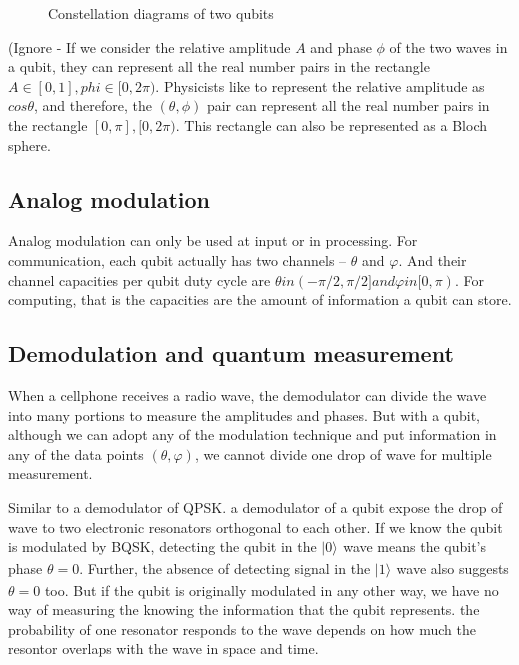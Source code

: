 \documentclass{book}
\newcommand{\keta}[2][]{\vert {#2} \rangle_{#1}}
\begin{document}
\begin{figure}[ht]
\caption{Constellation diagrams of two qubits}
\label{QAM}
\end{figure}

(Ignore - If we consider the relative amplitude $A$ and phase $\phi$ of the two waves in a qubit, they can represent all the real number pairs in the rectangle ${ A \in [0,1], phi \in [0,2\pi) }$. Physicists like to represent the relative amplitude as $cos\theta$, and therefore, the $(\theta, \phi)$ pair can represent all the real number pairs in the rectangle ${[0,\pi],  [0,2\pi)}$. This rectangle can also be represented as a Bloch sphere.

\subsection{Analog modulation}
Analog modulation can only be used at input or in processing. For communication, each qubit actually has two channels -- $\theta$ and $\varphi$. And their channel capacities per qubit duty cycle are $\theta in (-\pi/2, \pi/2] and \varphi in [0, \pi)$. For computing, that is the capacities are the amount of information a qubit can store.

\subsection{Demodulation and quantum measurement}
When a cellphone receives a radio wave, the demodulator can divide the wave into many portions to measure the amplitudes and phases. But with a qubit, although we can adopt any of the modulation technique and put information in any of the data points $(\theta, \varphi)$, we cannot divide one drop of wave for multiple measurement.

Similar to a demodulator of QPSK. a demodulator of a qubit expose the drop of wave to two electronic resonators orthogonal to each other.  If we know the qubit is modulated by BQSK, detecting the qubit in the $\keta{0}$ wave means the qubit's phase $\theta = 0$. Further, the absence of detecting signal in the $\keta{1}$ wave also suggests $\theta = 0$ too. But if the qubit is originally modulated in any other way, we have no way of measuring the knowing the information that the qubit represents. the probability of one resonator responds to the wave depends on how much the resontor overlaps with the wave in space and time.
\end{document}
